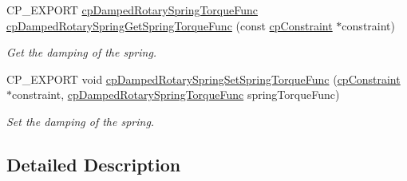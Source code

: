 \begin{DoxyCompactItemize}
\mbox{\label{group__cp_damped_rotary_spring_ga95cce882935976957ee262590b5a1bbc}} 
C\+P\+\_\+\+E\+X\+P\+O\+RT \mbox{\hyperlink{group__cp_damped_rotary_spring_ga072c236959020fab4f30087b5234040b}{cp\+Damped\+Rotary\+Spring\+Torque\+Func}} \mbox{\hyperlink{group__cp_damped_rotary_spring_ga95cce882935976957ee262590b5a1bbc}{cp\+Damped\+Rotary\+Spring\+Get\+Spring\+Torque\+Func}} (const \mbox{\hyperlink{structcp_constraint}{cp\+Constraint}} $\ast$constraint)
\begin{DoxyCompactList}\small\item\em Get the damping of the spring. \end{DoxyCompactList}\item 
\mbox{\label{group__cp_damped_rotary_spring_ga79b061501fb25d4163a301330e10bb26}} 
C\+P\+\_\+\+E\+X\+P\+O\+RT void \mbox{\hyperlink{group__cp_damped_rotary_spring_ga79b061501fb25d4163a301330e10bb26}{cp\+Damped\+Rotary\+Spring\+Set\+Spring\+Torque\+Func}} (\mbox{\hyperlink{structcp_constraint}{cp\+Constraint}} $\ast$constraint, \mbox{\hyperlink{group__cp_damped_rotary_spring_ga072c236959020fab4f30087b5234040b}{cp\+Damped\+Rotary\+Spring\+Torque\+Func}} spring\+Torque\+Func)
\begin{DoxyCompactList}\small\item\em Set the damping of the spring. \end{DoxyCompactList}\end{DoxyCompactItemize}


\subsection{Detailed Description}
